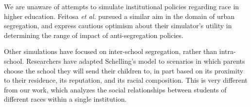 We are unaware of attempts to simulate institutional policies regarding race
in higher education. Feitosa \textit{et al.}
\citeyear{feitosa_multi-agent_2011} pursued a similar aim in the domain of
urban segregation, and express cautious optimism about their simulator's
utility in determining the range of impact of anti-segregation policies.

Other simulations have focused on inter-school segregation, rather than
intra-school. Researchers \cite[for instance]{stoica_schelling_2014,millington_aspiration_2014} have adapted
Schelling's model to scenarios in which parents choose the school they will
send their children to, in part based on its proximity to their residence, its
reputation, and its racial composition. This is very different from our work,
which analyzes the social relationships between students of different races
within a single institution.

